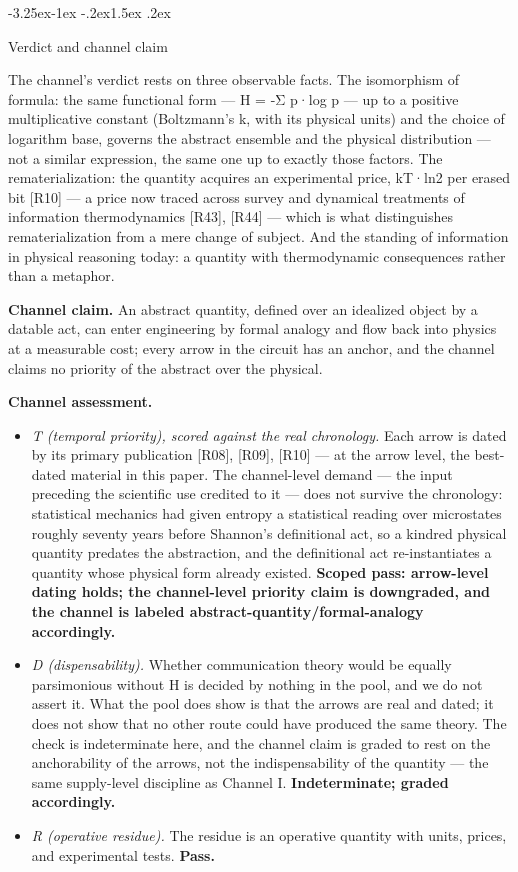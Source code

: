 \documentclass[11pt,a4paper]{article}
\makeatletter
\renewcommand\subsection{\@startsection{subsection}{2}{\z@}%
  {-3.25ex\@plus -1ex \@minus -.2ex}{1.5ex \@plus .2ex}%
  {\normalfont\large\bfseries\raggedright}}
\makeatother
\begin{document}
\subsection{Verdict and channel claim}

The channel's verdict rests on three observable facts. The isomorphism of formula: the same functional form — H = -Σ p·log p — up to a positive multiplicative constant (Boltzmann's k, with its physical units) and the choice of logarithm base, governs the abstract ensemble and the physical distribution — not a similar expression, the same one up to exactly those factors. The rematerialization: the quantity acquires an experimental price, kT·ln2 per erased bit [R10] — a price now traced across survey and dynamical treatments of information thermodynamics [R43], [R44] — which is what distinguishes rematerialization from a mere change of subject. And the standing of information in physical reasoning today: a quantity with thermodynamic consequences rather than a metaphor.

\textbf{Channel claim.} An abstract quantity, defined over an idealized object by a datable act, can enter engineering by formal analogy and flow back into physics at a measurable cost; every arrow in the circuit has an anchor, and the channel claims no priority of the abstract over the physical.

\textbf{Channel assessment.}

\begin{itemize}[leftmargin=1.6em,itemsep=2pt,parsep=0pt,topsep=3pt]
\item \textit{T (temporal priority), scored against the real chronology.} Each arrow is dated by its primary publication [R08], [R09], [R10] — at the arrow level, the best-dated material in this paper. The channel-level demand — the input preceding the scientific use credited to it — does not survive the chronology: statistical mechanics had given entropy a statistical reading over microstates roughly seventy years before Shannon's definitional act, so a kindred physical quantity predates the abstraction, and the definitional act re-instantiates a quantity whose physical form already existed. \textbf{Scoped pass: arrow-level dating holds; the channel-level priority claim is downgraded, and the channel is labeled abstract-quantity/formal-analogy accordingly.}
\item \textit{D (dispensability).} Whether communication theory would be equally parsimonious without H is decided by nothing in the pool, and we do not assert it. What the pool does show is that the arrows are real and dated; it does not show that no other route could have produced the same theory. The check is indeterminate here, and the channel claim is graded to rest on the anchorability of the arrows, not the indispensability of the quantity — the same supply-level discipline as Channel I. \textbf{Indeterminate; graded accordingly.}
\item \textit{R (operative residue).} The residue is an operative quantity with units, prices, and experimental tests. \textbf{Pass.}
\end{itemize}
\end{document}
